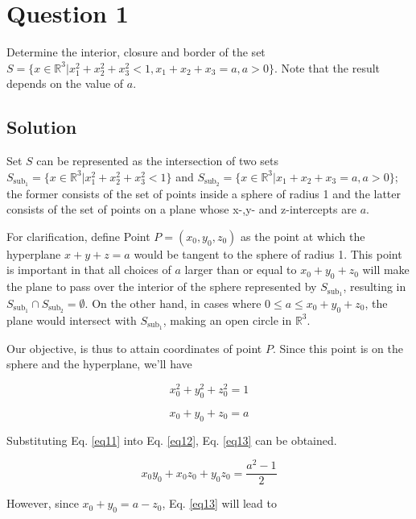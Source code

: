 \section*{Question 1}

Determine the interior, closure and border of the set $S = \{x \in \mathbb{R}^3 | x_1^2 + x_2^2 + x_3^2 < 1, x_1+x_2+x_3 = a, a > 0\}$. Note that the result depends on the value of $a$.

\subsection*{Solution}

Set $S$ can be represented as the intersection of two sets $S_{\text{sub}_1} = \{x \in \mathbb{R}^3 | x_1^2 + x_2^2 + x_3^2 < 1\}$ and $S_{\text{sub}_2} = \{x \in \mathbb{R}^3 | x_1 + x_2 + x_3 = a, a > 0\}$; the former consists of the set of points inside a sphere of radius 1 and the latter consists of the set of points on a plane whose x-,y- and z-intercepts are $a$.

For clarification, define Point $P = (x_0, y_0, z_0)$ as the point at which the hyperplane $x + y + z = a$ would be tangent to the sphere of radius 1. This point is important in that all choices of $a$ larger than or equal to $x_0 + y_0 + z_0$ will make the plane to pass over the interior of the sphere represented by $S_{\text{sub}_1}$, resulting in $S_{\text{sub}_1} \cap S_{\text{sub}_2} = \emptyset$. On the other hand, in cases where $0 \leq a \leq x_0+y_0+z_0$, the plane would intersect with $S_{\text{sub}_1}$, making an open circle in $\mathbb{R}^3$.

Our objective, is thus to attain coordinates of point $P$. Since this point is on the sphere and the hyperplane, we'll have

\begin{equation}
x_0^2 + y_0^2 + z_0^2 = 1
\label{eq11}
\end{equation}

\begin{equation}
x_0 + y_0 + z_0 = a
\label{eq12}
\end{equation}

Substituting Eq. \ref{eq11} into Eq. \ref{eq12}, Eq. \ref{eq13} can be obtained.

\begin{equation}
x_0y_0 + x_0z_0 + y_0z_0 = \frac{a^2-1}{2}
\label{eq13}
\end{equation}

However, since $x_0 + y_0 = a - z_0$, Eq. \ref{eq13} will lead to

